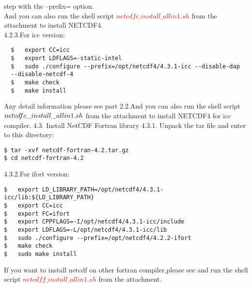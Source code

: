 \documentclass[paper=a4, fontsize=11pt]{scrartcl}
\numberwithin{equation}{section}
\numberwithin{figure}{section}
\numberwithin{table}{section}
\begin{document}
 step with the --prefix= option.
 \\
 And you can also run  the shell script \textcolor{red}{$netcdfc\_install\_allin1.sh$} from the attachment to install NETCDF4.
 \\
\large{4.2.3}.For icc version:
\\
 {\color{blue}\begin{verbatim}
  $   export CC=icc
  $   export LDFLAGS=-static-intel
  $   sudo ./configure --prefix=/opt/netcdf4/4.3.1-icc --disable-dap
  --disable-netcdf-4
  $   make check
  $   make install
 \end{verbatim}}
 Any detail information please see part 2.2.And you can also run  the shell script 
 \textcolor{red}{$netcdfc\_ \\
 install\_allin1.sh$} from the attachment to install NETCDF4 for icc compiler.
 \newline
 \Large{4.3}. Install NetCDF Fortran library
 \newline
\large{4.3.1}. Unpack the tar file and enter to this directory:
{\color{blue}\begin{verbatim}
$ tar -xvf netcdf-fortran-4.2.tar.gz
$ cd netcdf-fortran-4.2
\end{verbatim}}
\large{4.3.2}.For ifort version:
\\
{\color{blue}\begin{verbatim}
$   export LD_LIBRARY_PATH=/opt/netcdf4/4.3.1-icc/lib:${LD_LIBRARY_PATH}
$   export CC=icc
$   export FC=ifort
$   export CPPFLAGS=-I/opt/netcdf4/4.3.1-icc/include
$   export LDFLAGS=-L/opt/netcdf4/4.3.1-icc/lib
$   sudo ./configure --prefix=/opt/netcdf4/4.2.2-ifort
$   make check
$   sudo make install
\end{verbatim}}
If you want to install netcdf on other fortran compiler,please see and run  the shell script 
 \textcolor{red}{$netcdff\_install\_allin1.sh$} from the attachment.
\end{document}
